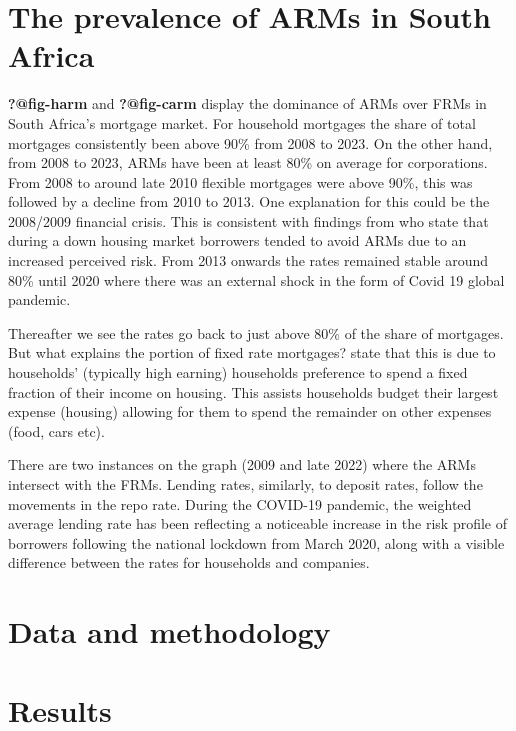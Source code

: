 \documentclass[
  letterpaper,
  DIV=11,
  numbers=noendperiod]{scrartcl}
\begin{document}
\section{The prevalence of ARMs in South
Africa}\label{the-prevalence-of-arms-in-south-africa}

\textbf{?@fig-harm} and \textbf{?@fig-carm} display the dominance of
ARMs over FRMs in South Africa's mortgage market. For household
mortgages the share of total mortgages consistently been above 90\% from
2008 to 2023. On the other hand, from 2008 to 2023, ARMs have been at
least 80\% on average for corporations. From 2008 to around late 2010
flexible mortgages were above 90\%, this was followed by a decline from
2010 to 2013. One explanation for this could be the 2008/2009 financial
crisis. This is consistent with findings from \citet{kim2016borrower}
who state that during a down housing market borrowers tended to avoid
ARMs due to an increased perceived risk. From 2013 onwards the rates
remained stable around 80\% until 2020 where there was an external shock
in the form of Covid 19 global pandemic.

Thereafter we see the rates go back to just above 80\% of the share of
mortgages. But what explains the portion of fixed rate mortgages?
\citet{damen2016effect} state that this is due to households' (typically
high earning) households preference to spend a fixed fraction of their
income on housing. This assists households budget their largest expense
(housing) allowing for them to spend the remainder on other expenses
(food, cars etc).

There are two instances on the graph (2009 and late 2022) where the ARMs
intersect with the FRMs. Lending rates, similarly, to deposit rates,
follow the movements in the repo rate. During the COVID-19 pandemic, the
weighted average lending rate has been reflecting a noticeable increase
in the risk profile of borrowers following the national lockdown from
March 2020, along with a visible difference between the rates for
households and companies.

\section{Data and methodology}\label{data-and-methodology}

\section{Results}\label{results}
\end{document}
